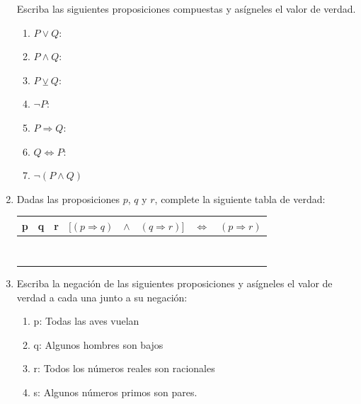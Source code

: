 \documentclass[letterpaper,fleqn]{article}
\begin{document}
\begin{enumerate}
Escriba las siguientes proposiciones compuestas y asígneles el valor de verdad.
\begin{enumerate}
\item $P\vee Q$: \noanswer
\item $P\wedge Q$: \noanswer
\item $P \veebar Q$: \noanswer
\item $\neg P$: \noanswer
\newpage
\item $P\Rightarrow Q$: \noanswer
\item $Q\Leftrightarrow P$: \noanswer
\item $\neg (P\wedge Q)$ \noanswer
\end{enumerate}
\item Dadas las proposiciones $p$, $q$ y $r$, complete la siguiente tabla de verdad:
\begin{center}
\begin{tabular}{|c|c|c|ccccc|}
\hline 
p & q & r & $[(p\Rightarrow q)$ & $\wedge$ & $(q\Rightarrow r)]$ & $\Leftrightarrow$ & $(p\Rightarrow r)$ \\ 
\hline 
 & & & & & & &  \\ 
 & & & & & & &  \\ 
 & & & & & & &  \\ 
  & & & & & & &  \\ 
   & & & & & & &  \\ 
    & & & & & & &  \\ 
     & & & & & & &  \\ 
      & & & & & & &  \\ \hline
\end{tabular} 
\end{center}
\item Escriba la negación de las siguientes proposiciones y asígneles el valor de verdad a cada una junto a su negación:
\begin{enumerate}
\item p: Todas las aves vuelan \noanswer
\item q: Algunos hombres son bajos \noanswer
\item r: Todos los números reales son racionales\noanswer
\item s: Algunos números primos son pares.
\end{enumerate}
 \end{enumerate}
\end{document}
